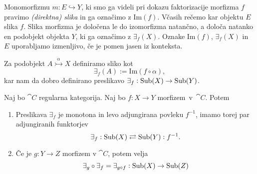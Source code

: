 \documentclass[../kategoricna_logika.tex]{subfiles}
\begin{document}
\begin{definicija}
  Monomorfizmu $m : E \hookrightarrow Y$, ki smo ga videli pri dokazu
  faktorizacije morfizma $f$ pravimo \emph{(direktna) slika} in ga
  označimo z $\mathrm{Im}(f)$.  Včasih rečemo kar objektu $E$ slika
  $f$. Slika morfizma je določena le do izomorfizma natančno, a določa
  natanko en podobjekt objekta $Y$, ki ga označimo z $\exists_f(X)$.
  Oznake $\mathrm{Im}(f)$, $\exists_f(X)$ in $E$ uporabljamo
  izmenljivo, če je pomen jasen iz konteksta.

  Za podobjekt $A \overset{\alpha}{\rightarrowtail} X$ definiramo
  sliko kot
$$\exists_f(A) := \mathrm{Im}(f \circ \alpha),$$
kar nam da dobro definirano preslikavo
$\exists_f : \operatorname{Sub}(X) \to \operatorname{Sub}(Y)$.
\end{definicija}
\begin{comment}
  Če se malo poigramo s temi slikami, dobimo diagram
  \begin{equation*}
    \begin{tikzcd}
      A \times_Y A \ar[d, shift left , "a_1"] \ar[d, shift right,
      "a_2"'] \ar[r, dashed, "u"] &
      X \times_Y X \ar[d, shift left, "p_1"] \ar[d, shift right, "p_2"'] & \\
      A \ar[d, two heads, "a"] \ar[r, tail, "\alpha"] & X \ar[dr, "f"]
      \ar[r, two heads, "q"] &
      \exists_f X \ar[d, tail, "m"] \\
      \exists_f A \ar[rr, tail] \ar[urr, dashed, "\dot{\imath}"] & & Y
    \end{tikzcd}
  \end{equation*}
  iz katerega lahko zaradi enoličnosti slik (do izomorfizma natančno)
  razberemo, da je $\dot{\imath}$ monomorfizem.
\end{comment}
\begin{lema}
  Naj bo $\cat{C}$ regularna kategorija. Naj bo $f : X \to Y$
  morfizem~v~$\cat{C}$. Potem
  \begin{enumerate}[label=(\roman*)]
  \item Preslikava $\exists_f$ je monotona in levo adjungirana povleku
    $f^{-1}$, imamo torej par adjungiranih funktorjev
    $$\exists_f : \operatorname{Sub}(X) \rightleftarrows \operatorname{Sub}(Y) : f^{-1}.$$
  \item Če je $g : Y \to Z$ morfizem v $\cat{C}$, potem velja
    $$\exists_g \circ \exists_f = \exists_{g \circ f} : \operatorname{Sub}(X) \to
    \operatorname{Sub}(Z)$$
  \end{enumerate}
\end{lema}
\end{document}
